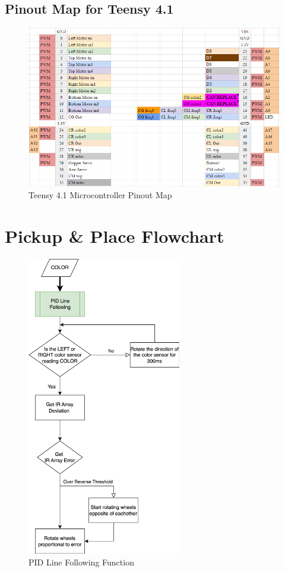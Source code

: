 \documentclass[12pt]{report}
\begin{document}
\subsection{Pinout Map for Teensy 4.1}
\begin{figure}[H]
    \centering
    \includegraphics[width=1\textwidth]{Images/PinoutMap/Pinout map.PNG}
    \caption{Teensy 4.1 Microcontroller Pinout Map}
    \label{fig:Pinoutmap}
\end{figure}

\section{Pickup \& Place Flowchart}\label{sc:pickup-place-flowchart}

\begin{figure}[H]
    \centering
    \includegraphics[width=0.6\textwidth]{Images/flowchart/pid_line_following.pdf}
    \caption{PID Line Following Function}
    \label{fig:fc:pid_line_following}
\end{figure}
\end{document}
